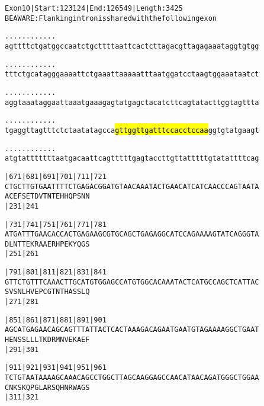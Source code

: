 \documentclass{article}
\begin{document}
\begin{alltt}
Exon 10 | Start: 123124 | End: 126549 | Length: 3425
BE AWARE: Flanking intron is shared with the following exon

.    .    .    .    .    .    .    .    .    .    .    .    
agttttctgatggccaatctgcttttaattcactcttagacgttagagaaataggtgtgg

.    .    .    .    .    .    .    .    .    .    .    .    
tttctgcatagggaaaattctgaaattaaaaatttaatggatcctaagtggaaataatct

.    .    .    .    .    .    .    .    .    .    .    .    
aggtaaataggaattaaatgaaagagtatgagctacatcttcagtatacttggtagttta

.    .    .    .    .    .    .    .    .    .    .    .    
tgaggttagtttctctaatatagcca\hl{gttggttgatttccacctccaa}ggtgtatgaagt

.    .    .    .    .    .    .    .    .    .    .    .    
atgtatttttttaatgacaattcagtttttgagtaccttgttatttttgtatattttcag

|671      |681      |691      |701      |711      |721      
CTGCTTGTGAATTTTCTGAGACGGATGTAACAAATACTGAACATCATCAACCCAGTAATA
  A  C  E  F  S  E  T  D  V  T  N  T  E  H  H  Q  P  S  N  N
                    |231                          |241      

|731      |741      |751      |761      |771      |781      
ATGATTTGAACACCACTGAGAAGCGTGCAGCTGAGAGGCATCCAGAAAAGTATCAGGGTA
  D  L  N  T  T  E  K  R  A  A  E  R  H  P  E  K  Y  Q  G  S
                    |251                          |261      

|791      |801      |811      |821      |831      |841      
GTTCTGTTTCAAACTTGCATGTGGAGCCATGTGGCACAAATACTCATGCCAGCTCATTAC
  S  V  S  N  L  H  V  E  P  C  G  T  N  T  H  A  S  S  L  Q
                    |271                          |281      

|851      |861      |871      |881      |891      |901      
AGCATGAGAACAGCAGTTTATTACTCACTAAAGACAGAATGAATGTAGAAAAGGCTGAAT
  H  E  N  S  S  L  L  L  T  K  D  R  M  N  V  E  K  A  E  F
                    |291                          |301      

|911      |921      |931      |941      |951      |961      
TCTGTAATAAAAGCAAACAGCCTGGCTTAGCAAGGAGCCAACATAACAGATGGGCTGGAA
  C  N  K  S  K  Q  P  G  L  A  R  S  Q  H  N  R  W  A  G  S
                    |311                          |321      

\end{alltt}
\newpage
\end{document}
